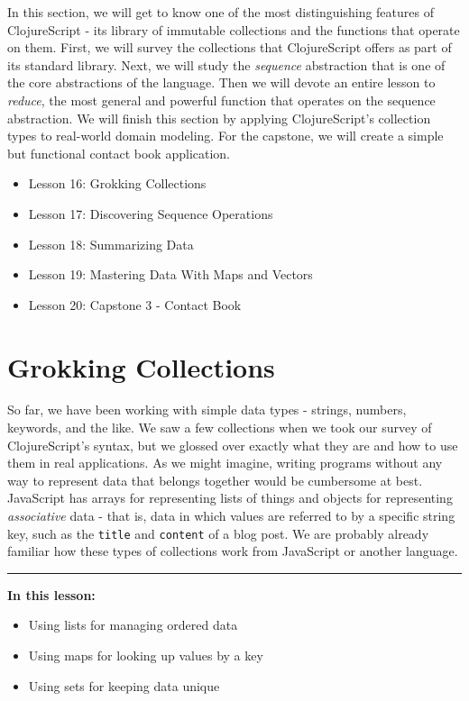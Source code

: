 \documentclass[10pt,twoside,openright]{memoir}
\begin{document}
In this section, we will get to know one of the most distinguishing
features of ClojureScript - its library of immutable collections and the
functions that operate on them. First, we will survey the collections
that ClojureScript offers as part of its standard library. Next, we will
study the \emph{sequence} abstraction that is one of the core
abstractions of the language. Then we will devote an entire lesson to
\emph{reduce}, the most general and powerful function that operates on
the sequence abstraction. We will finish this section by applying
ClojureScript's collection types to real-world domain modeling. For the
capstone, we will create a simple but functional contact book
application.

\begin{itemize}
\tightlist
\item Lesson 16: Grokking Collections
\item Lesson 17: Discovering Sequence Operations
\item Lesson 18: Summarizing Data
\item Lesson 19: Mastering Data With Maps and Vectors
\item Lesson 20: Capstone 3 - Contact Book
\end{itemize}

\chapter{Grokking Collections}

So far, we have been working with simple data types - strings, numbers,
keywords, and the like. We saw a few collections when we took our survey
of ClojureScript's syntax, but we glossed over exactly what they are and
how to use them in real applications. As we might imagine, writing
programs without any way to represent data that belongs together would
be cumbersome at best. JavaScript has arrays for representing lists of
things and objects for representing \emph{associative} data - that is,
data in which values are referred to by a specific string key, such as
the \texttt{title} and \texttt{content} of a blog post. We are probably
already familiar how these types of collections work from JavaScript or
another language.

\begin{center}\rule{0.5\linewidth}{0.5pt}\end{center}

\textbf{In this lesson:}

\begin{itemize}
\tightlist
\item
  Using lists for managing ordered data
\item
  Using maps for looking up values by a key
\item
  Using sets for keeping data unique
\end{itemize}
\end{document}
